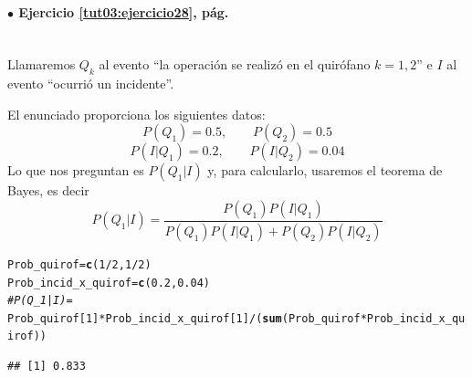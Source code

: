 \documentclass[10pt,a4paper]{article}\usepackage[]{graphicx}\usepackage[]{color}
\makeatletter
\newcommand{\hlnum}[1]{\textcolor[rgb]{0.686,0.059,0.569}{#1}}%
\newcommand{\hlcom}[1]{\textcolor[rgb]{0.678,0.584,0.686}{\textit{#1}}}%
\newcommand{\hlopt}[1]{\textcolor[rgb]{0,0,0}{#1}}%
\newcommand{\hlstd}[1]{\textcolor[rgb]{0.345,0.345,0.345}{#1}}%
\newcommand{\hlkwb}[1]{\textcolor[rgb]{0.69,0.353,0.396}{#1}}%
\newcommand{\hlkwd}[1]{\textcolor[rgb]{0.737,0.353,0.396}{\textbf{#1}}}%
\newenvironment{kframe}{%
 \def\at@end@of@kframe{}%
 \ifinner\ifhmode%
  \def\at@end@of@kframe{\end{minipage}}%
  \begin{minipage}{\columnwidth}%
 \fi\fi%
 \def\FrameCommand##1{\hskip\@totalleftmargin \hskip-\fboxsep
 \colorbox{shadecolor}{##1}\hskip-\fboxsep
     \hskip-\linewidth \hskip-\@totalleftmargin \hskip\columnwidth}%
 \MakeFramed {\advance\hsize-\width
   \@totalleftmargin\z@ \linewidth\hsize
   \@setminipage}}%
 {\par\unskip\endMakeFramed%
 \at@end@of@kframe}
\newenvironment{knitrout}{}{} %
\makeatother
\begin{document}
\paragraph{\bf $\bullet$ Ejercicio \ref{tut03:ejercicio28}, pág. \pageref{tut03:ejercicio28}}
\label{tut03:ejercicio28:sol}\quad\\
Llamaremos $Q_k$ al evento ``la operación se realizó en el  quirófano $k=1,2$'' e $I$ al evento ``ocurrió un incidente''.

El enunciado proporciona los siguientes datos: 
$$P(Q_1)=0\text{.}5,\qquad P(Q_2)=0\text{.}5$$
$$P(I|Q_1)=0\text{.}2,\qquad P(I|Q_2)=0\text{.}04$$ 
Lo que nos preguntan es $P(Q_1|I)$ y, para calcularlo,  usaremos el teorema de Bayes, es decir
$$P(Q_1|I) = \frac{P(Q_1)P(I|Q_1)}{P(Q_1)P(I|Q_1)+P(Q_2)P(I|Q_2)}$$

\begin{knitrout}
\color{fgcolor}\begin{kframe}
\begin{alltt}
\hlstd{Prob_quirof} \hlkwb{=} \hlkwd{c}\hlstd{(}\hlnum{1}\hlopt{/}\hlnum{2}\hlstd{,} \hlnum{1}\hlopt{/}\hlnum{2}\hlstd{)}
\hlstd{Prob_incid_x_quirof} \hlkwb{=} \hlkwd{c}\hlstd{(}\hlnum{0.2}\hlstd{,} \hlnum{0.04}\hlstd{)}
\hlcom{# P(Q_1|I) =}
\hlstd{Prob_quirof[}\hlnum{1}\hlstd{]}\hlopt{*}\hlstd{Prob_incid_x_quirof[}\hlnum{1}\hlstd{]}\hlopt{/}\hlstd{(}\hlkwd{sum}\hlstd{(Prob_quirof}\hlopt{*}\hlstd{Prob_incid_x_quirof))}
\end{alltt}
\begin{verbatim}
## [1] 0.833
\end{verbatim}
\end{kframe}
\end{knitrout}

\end{document}
